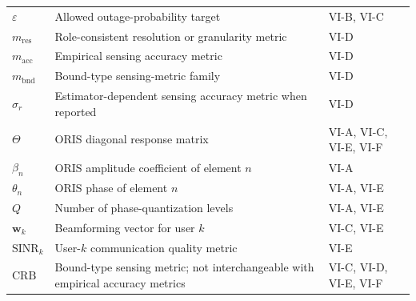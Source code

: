 \documentclass[letterpaper,journal]{IEEEtran}
\begin{document}
\begin{table}[!t]
\begin{tabularx}{\columnwidth}{@{}>{\raggedright\arraybackslash}p{1.85cm}>{\raggedright\arraybackslash}X>{\raggedright\arraybackslash}p{1.55cm}@{}}
        $\varepsilon$        & Allowed outage-probability target                                                                            & VI-B, VI-C             \\
        $m_{\text{res}}$     & Role-consistent resolution or granularity metric                                                             & VI-D                   \\
        $m_{\text{acc}}$     & Empirical sensing accuracy metric                                                                            & VI-D                   \\
        $m_{\text{bnd}}$     & Bound-type sensing-metric family                                                                             & VI-D                   \\
        $\sigma_r$           & Estimator-dependent sensing accuracy metric when reported                                                    & VI-D                   \\
        $\Theta$             & ORIS diagonal response matrix                                                                                & VI-A, VI-C, VI-E, VI-F \\
        $\beta_n$            & ORIS amplitude coefficient of element $n$                                                                    & VI-A                   \\
        $\theta_n$           & ORIS phase of element $n$                                                                                    & VI-A, VI-E             \\
        $Q$                  & Number of phase-quantization levels                                                                          & VI-A, VI-E             \\
        $\mathbf{w}_k$       & Beamforming vector for user $k$                                                                              & VI-C, VI-E             \\
        $\mathrm{SINR}_k$    & User-$k$ communication quality metric                                                                        & VI-E                   \\
        $\mathrm{CRB}$       & Bound-type sensing metric; not interchangeable with empirical accuracy metrics                               & VI-C, VI-D, VI-E, VI-F \\
        \bottomrule
    \end{tabularx}
\end{table}
\end{document}
